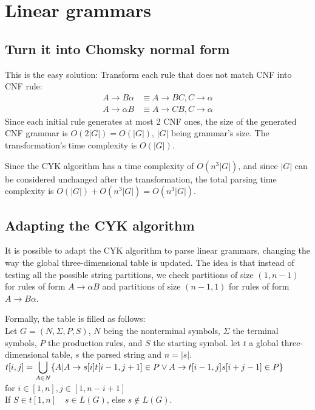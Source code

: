 \documentclass[twocolumn]{article}
\begin{document}
\section{Linear grammars}
\subsection{Turn it into Chomsky normal form}
This is the easy solution: Transform each rule that does not match CNF into CNF
rule:
\begin{align*}
  A\rightarrow B\alpha&\equiv A\rightarrow BC,C\rightarrow\alpha \\
  A\rightarrow\alpha B&\equiv A\rightarrow CB,C\rightarrow\alpha
\end{align*}
Since each initial rule generates at most 2 CNF ones, the size of the generated
CNF grammar is $O(2|G|)=O(|G|)$, $|G|$ being grammar's size. The transformation's time complexity is $O(|G|)$.

Since the CYK algorithm has a time complexity of $O(n^3|G|)$, and since $|G|$ can be considered unchanged after the transformation, the total parsing time complexity is $O(|G|)+O(n^3|G|)=O(n^3|G|)$.

\subsection{Adapting the CYK algorithm}
It is possible to adapt the CYK algorithm to parse linear grammars, changing the way the global three-dimensional table is updated. The idea is that instead of testing all the possible string partitions, we check partitions of size $(1, n-1)$ for rules of form $A\rightarrow\alpha B$ and partitions of size $(n-1,1)$ for rules of form $A\rightarrow B\alpha$.

Formally, the table is filled as follows:\\
Let $G=(N,\Sigma,P,S)$, $N$ being the nonterminal symbols, $\Sigma$ the terminal symbols, $P$ the production rules, and $S$ the starting symbol. let $t$ a global three-dimensional table, $s$ the parsed string and $n = |s|$.\\
$t[i,j]=\displaystyle\bigcup_{A\in N}\{A|A\rightarrow s[i]t[i-1,j+1]\in P\newline\lor A \rightarrow t[i-1,j]s[i+j-1] \in P\}$\\for $i\in [1,n],j \in [1, n-i+1]$\\
If $S \in t[1,n]\quad s \in L(G)$, else $s \notin L(G)$.
\end{document}

